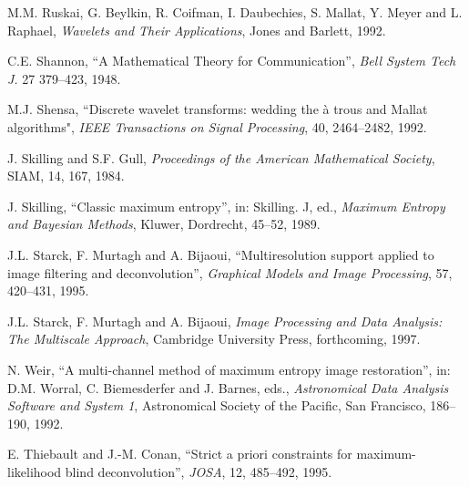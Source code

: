 \documentclass[11pt,a4paper]{article}
\begin{document}
\begin{thebibliography}{99}
  M.M. Ruskai, G. Beylkin, R. Coifman, I. Daubechies,
 S. Mallat, Y. Meyer and  L. Raphael, {\it Wavelets and Their Applications},
 Jones and Barlett, 1992.

 C.E. Shannon,  
``A Mathematical Theory for Communication'', {\it Bell System Tech J.} 27 
379--423, 1948.

 M.J. Shensa, ``Discrete wavelet transforms:  
 wedding  the \`a trous and Mallat algorithms", {\it IEEE Transactions on 
 Signal
 Processing}, 40, 2464--2482, 1992.

 J. Skilling and S.F. Gull, {\it Proceedings of 
the American Mathematical Society}, SIAM, 14, 167, 1984.

 J. Skilling, ``Classic maximum entropy'', 
in: Skilling. J, ed., {\it Maximum 
Entropy and
Bayesian Methods}, Kluwer, Dordrecht, 45--52, 1989. 

  J.L. Starck, F. Murtagh and  A. Bijaoui, 
``Multiresolution support
 applied to image filtering and deconvolution'', {\it Graphical
Models and Image Processing}, 57, 420--431, 1995.

 J.L. Starck, F. Murtagh  and A. Bijaoui,  
{\it Image Processing and Data Analysis: The
Multiscale Approach},  Cambridge University Press, forthcoming, 1997.

 N. Weir, ``A multi-channel method of maximum entropy image
restoration'', in: D.M. Worral, C. Biemesderfer and J. Barnes, 
eds., {\it Astronomical Data Analysis Software and System 1}, Astronomical 
Society of the Pacific, San Francisco, 186--190, 1992.

 E. Thiebault and J.-M. Conan, ``Strict a priori
constraints for maximum-likelihood blind deconvolution'', {\it JOSA}, 
12, 485--492, 1995.

\end{thebibliography}
\end{document}

